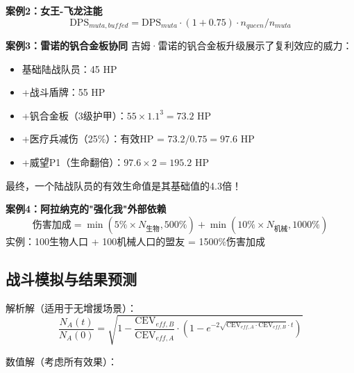 \documentclass[a4paper,12pt]{article}
\begin{document}
\textbf{案例2：女王-飞龙注能}
\begin{equation}
\text{DPS}_{muta,buffed} = \text{DPS}_{muta} \cdot (1 + 0.75) \cdot n_{queen}/n_{muta}
\end{equation}

\textbf{案例3：雷诺的钒合金板协同}
吉姆·雷诺的钒合金板升级展示了复利效应的威力：
\begin{itemize}
\item 基础陆战队员：45 HP
\item +战斗盾牌：55 HP
\item +钒合金板（3级护甲）：$55 \times 1.1^3 = 73.2$ HP
\item +医疗兵减伤（25\%）：有效HP = $73.2 / 0.75 = 97.6$ HP
\item +威望P1（生命翻倍）：$97.6 \times 2 = 195.2$ HP
\end{itemize}
最终，一个陆战队员的有效生命值是其基础值的4.3倍！

\textbf{案例4：阿拉纳克的"强化我"外部依赖}
\begin{equation}
\text{伤害加成} = \min(5\% \times N_{生物}, 500\%) + \min(10\% \times N_{机械}, 1000\%)
\end{equation}
实例：100生物人口 + 100机械人口的盟友 = 1500\%伤害加成

\subsection{战斗模拟与结果预测}
解析解（适用于无增援场景）：
\begin{equation}
\frac{N_A(t)}{N_A(0)} = \sqrt{1 - \frac{\text{CEV}_{eff,B}}{\text{CEV}_{eff,A}} \cdot (1 - e^{-2\sqrt{\text{CEV}_{eff,A} \cdot \text{CEV}_{eff,B}} \cdot t})}
\end{equation}

数值解（考虑所有效果）：
\begin{center}
\end{center}
\end{document}

